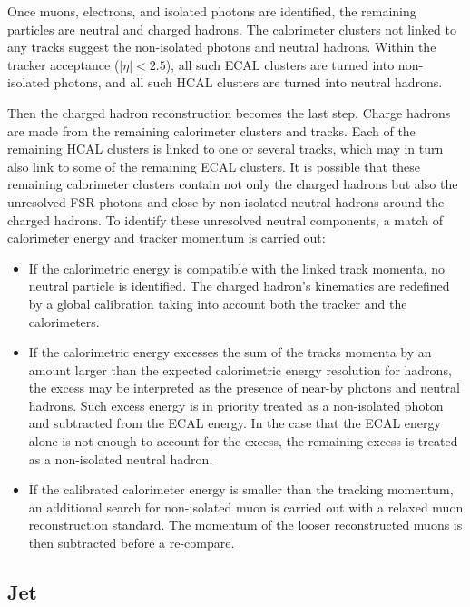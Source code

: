 Once muons, electrons, and isolated photons are identified, the remaining particles are neutral and charged hadrons. The calorimeter clusters not linked to any tracks suggest the non-isolated photons and neutral hadrons. Within the tracker acceptance ($|\eta|< 2.5$), all such ECAL clusters are turned into non-isolated photons, and all such HCAL clusters are turned into neutral hadrons. 

Then the charged hadron reconstruction becomes the last step. Charge hadrons are made from the remaining calorimeter clusters and tracks. Each of the remaining HCAL clusters is linked to one or several tracks, which may in turn also link to some of the remaining ECAL clusters. It is possible that these remaining calorimeter clusters contain not only the charged hadrons but also the unresolved FSR photons and close-by non-isolated neutral hadrons around the charged hadrons. To identify these unresolved neutral components, a match of calorimeter energy and tracker momentum is carried out:

\begin{itemize}
    \item If the calorimetric energy is compatible with the linked track momenta, no neutral particle is identified. The charged hadron's kinematics are redefined by a global calibration taking into account both the tracker and the calorimeters. 
    \item If the calorimetric energy excesses the sum of the tracks momenta by an amount larger than the expected calorimetric energy resolution for hadrons, the excess may be interpreted as the presence of near-by photons and neutral hadrons. Such excess energy is in priority treated as a non-isolated photon and subtracted from the ECAL energy. In the case that the ECAL energy alone is not enough to account for the excess, the remaining excess is treated as a non-isolated neutral hadron. 
    \item If the calibrated calorimeter energy is smaller than the tracking momentum, an additional search for non-isolated muon is carried out with a relaxed muon reconstruction standard. The momentum of the looser reconstructed muons is then subtracted before a re-compare.
\end{itemize}







\subsection{Jet}
\label{sec:cmsExperiment:reconstruction:jet}



